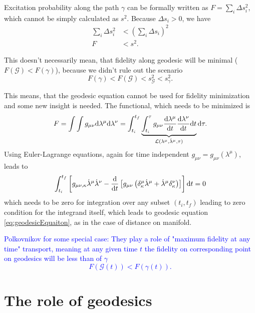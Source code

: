 Excitation probability along the path $\gamma$ can be formally written as $F=\sum_i\Delta s_i^2$, which cannot be simply calculated as $s^2$. Because $\Delta s_i>0$, we have
\begin{equation}
    \begin{split}
        \sum_i \Delta s_i^2& <(\sum_i\Delta s_i)^2\\
        F&<s^2.
    \end{split}
\end{equation}

This doesn't necessarily mean, that fidelity along geodesic will be minimal ($F(\mathcal{G})<F(\gamma)$), because we didn't rule out the scenario 
$$F(\gamma)<F(\mathcal{G})<s_\mathcal{G}^2<s_\gamma^2.$$

This means, that the geodesic equation cannot be used for fidelity minimization and some new insight is needed. The functional, which needs to be minimized is
\begin{equation}
    F=\int\int g_{\mu\nu}\mathrm{d}\lambda^\mu\mathrm{d}\lambda^\nu = \int_{t_i}^{t_f}\underbrace{\int_{t_i}^\tau g_{\mu\nu}\frac{\mathrm{d} \lambda^\mu}{\mathrm{d} t}\frac{\mathrm{d} \lambda^\nu}{\mathrm{d} t} \mathrm{d} t}_{\mathcal{L}(\lambda^\mu,\dot\lambda^\mu,\tau)}\mathrm{d} \tau .
\end{equation}
Using Euler-Lagrange equations, again for time independent $g_{\mu\nu}=g_{\mu\nu}(\lambda^\mu)$, leads to
\begin{equation}
    \int_{t_i}^{t_f}\left[g_{\mu\nu,\kappa}\dot\lambda^\mu\dot\lambda^\nu - \frac{\mathrm{d} }{\mathrm{d} t}\left[g_{\mu\nu}\left(\delta^\mu_\kappa\dot\lambda^\mu+\dot\lambda^\mu\delta^\nu_\kappa\right)\right]\right]\mathrm{d} t=0
\end{equation}
which needs to be zero for integration over any subset $(t_i,t_f)$ leading to zero condition for the integrand itself, which leads to geodesic equation \ref{eq:geodesicEquaiton}, as in the case of distance on manifold.



\textcolor{blue}{Polkovnikov for some special case: They play a role of "maximum fidelity at any time" transport, meaning at any given time $t$ the fidelity on corresponding point on geodesics will be less than of $\gamma$
$$F(\mathcal{G}(t))<F(\gamma(t)).$$ }









\section{The role of geodesics}


